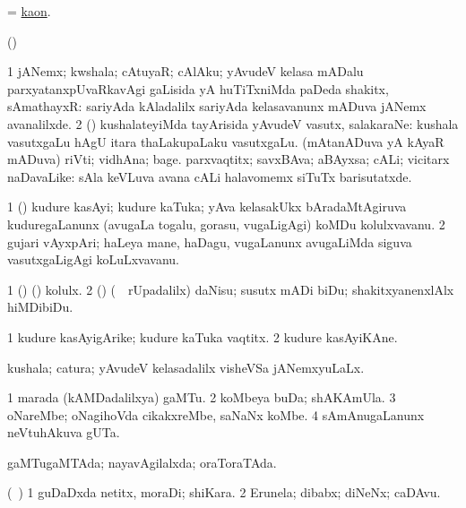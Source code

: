 \bentry
{}
\gl{\nA}
\bmng
 = \hyperlink{kaon}{kaon}. 
\emng
\eentry

\bentry
{}
\gl{\saMkiSx}
\bmng
(\nw)  
\emng
\eentry

\bentry
{}
\gl{\nA}
\bmng
\bnum
\num{1} jANemx; kwshala; cAtuyaR; cAlAku; yAvudeV kelasa mADalu parxyatanxpUvaRkavAgi gaLisida yA huTiTxniMda paDeda shakitx, sAmathayxR:  sariyAda kAladalilx sariyAda kelasavanunx mADuva jANemx avanalilxde. 
\num{2} (\pArxparx) kushalateyiMda tayArisida yAvudeV vasutx, salakaraNe:  kushala vasutxgaLu hAgU itara thaLakupaLaku vasutxgaLu. 
 (mAtanADuva yA kAyaR mADuva) 
\banum
{} riVti; vidhAna; bage. 
 parxvaqtitx; savxBAva; aBAyxsa; cALi; vicitarx naDavaLike:  sAla keVLuva avana cALi halavomemx siTuTx barisutatxde. 
\eanum
\numie
\enum
\emng
\eentry

\bentry
{}
\gl{\nA}
\bmng
\bnum
\num{1} (\birx) kudure kasAyi; kudure kaTuka; yAva kelasakUkx bAradaMtAgiruva kuduregaLanunx (avugaLa togalu, gorasu, \mo vugaLigAgi) koMDu kolulxvavanu. 
\num{2} gujari vAyxpAri; haLeya mane, haDagu, \mo vugaLanunx avugaLiMda siguva vasutxgaLigAgi koLuLxvavanu. 
\enum
\emng
\eentry

\bentry
{}
\gl{\sakirx}
\bmng
\bnum
\num{1} (\birx) (\ashi) kolulx. 
\num{2} (\rUpa) (\kanmu\ \BUkaq\ rUpadalilx) daNisu; susutx mADi biDu; shakitxyanenxlAlx hiMDibiDu. 
\enum
\emng
\eentry

\bentry
{}
\gl{\nA}
\bmng
\bnum
\num{1} kudure kasAyigArike; kudure kaTuka vaqtitx. 
\num{2} kudure kasAyiKAne. 
\enum
\emng
\eentry

\bentry
{}
\gl{\gu}
\bmng
kushala; catura; yAvudeV kelasadalilx visheVSa jANemxyuLaLx. 
\emng
\eentry

\bentry
{}
\gl{\nA}
\bmng
\bnum
\num{1} marada (kAMDadalilxya) gaMTu. 
\num{2} koMbeya buDa; shAKAmUla. 
\num{3} oNareMbe; oNagihoVda cikakxreMbe, saNaNx koMbe. 
\num{4} sAmAnugaLanunx neVtuhAkuva gUTa. 
\enum
\emng
\eentry

\bentry
{}
\gl{\gu}
\bmng
gaMTugaMTAda; nayavAgilalxda; oraToraTAda. 
\emng
\eentry

\bentry
{}
\gl{\nA}
\bmng
(\kanmu\ \pArxM) 
\bnum
\num{1} guDaDxda netitx, moraDi; shiKara. 
\num{2} Erunela; dibabx; diNeNx; caDAvu. 
\enum
\emng
\eentry

